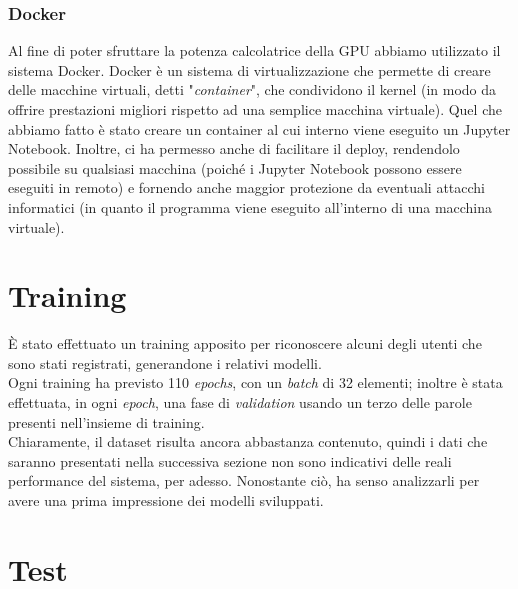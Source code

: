 \documentclass[8pt,notitlepage]{report}
\begin{document}
	\subsubsection*{Docker}
	Al fine di poter sfruttare la potenza calcolatrice della GPU abbiamo utilizzato il sistema Docker. Docker è un sistema di virtualizzazione che permette di creare delle macchine virtuali, detti "\textit{container}", che condividono il kernel (in modo da offrire prestazioni migliori rispetto ad una semplice macchina virtuale). Quel che abbiamo fatto è stato creare un container al cui interno viene eseguito un Jupyter Notebook. Inoltre, ci ha permesso anche di facilitare il deploy, rendendolo possibile su qualsiasi macchina (poiché i Jupyter Notebook possono essere eseguiti in remoto) e fornendo anche maggior protezione da eventuali attacchi informatici (in quanto il programma viene eseguito all'interno di una macchina virtuale). 
	
	\section{Training}
		È stato effettuato un training apposito per riconoscere alcuni degli utenti che sono stati registrati, generandone i relativi modelli. \\ 
		Ogni training ha previsto 110 \textit{epochs}, con un \textit{batch} di 32 elementi; inoltre è stata effettuata, in ogni \textit{epoch}, una fase di \textit{validation} usando un terzo delle parole presenti nell'insieme di training. \\
		Chiaramente, il dataset risulta ancora abbastanza contenuto, quindi i dati che saranno presentati nella successiva sezione non sono indicativi delle reali performance del sistema, per adesso. Nonostante ciò, ha senso analizzarli per avere una prima impressione dei modelli sviluppati.
		
	\section{Test}
		
\end{document}
